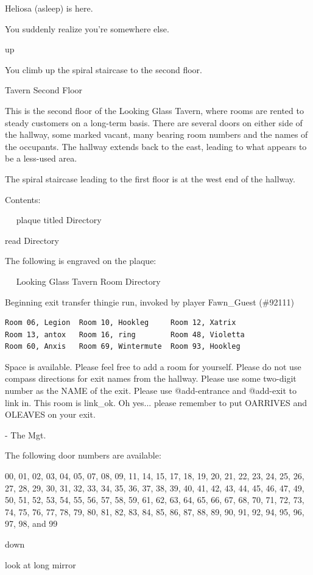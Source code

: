 \documentclass[10pt,twoside,openany]{memoir}
\begin{document}
{Heliosa (asleep) is here.

You suddenly realize you're somewhere else.

up

You climb up the spiral staircase to the second floor.

Tavern Second Floor

This is the second floor of the Looking Glass Tavern, where rooms are
rented to steady customers on a long-term basis.  There are several doors on
either side of the hallway, some marked vacant, many bearing room numbers and
the names of the occupants.  The hallway extends back to the east, leading
to what appears to be a less-used area.

The spiral staircase leading to the first floor is at the west end of the
 hallway.

Contents:

~ ~plaque titled Directory

read Directory

The following is engraved on the plaque:

~ ~Looking Glass Tavern Room Directory

Beginning exit transfer thingie run, invoked by player Fawn\_Guest (\#92111)

\begin{verbatim}
Room 06, Legion  Room 10, Hookleg     Room 12, Xatrix
Room 13, antox   Room 16, ring        Room 48, Violetta
Room 60, Anxis   Room 69, Wintermute  Room 93, Hookleg
\end{verbatim}

Space is available.  Please feel free to add a room for yourself.
Please do not use compass directions for exit names from the hallway.
Please use some two-digit number as the NAME of the exit.
Please use @add-entrance and @add-exit to link in.  This room is link\_ok.
Oh yes... please remember to put OARRIVES and OLEAVES on your exit.

- The Mgt.

The following door numbers are available:

00, 01, 02, 03, 04, 05, 07, 08, 09, 11, 14, 15, 17, 18, 19, 20, 21, 22, 23, 24, 25, 26, 27, 28, 29, 30, 31, 32, 33, 34, 35, 36, 37, 38, 39, 40, 41, 42, 43, 44, 45, 46, 47, 49, 50, 51, 52, 53, 54, 55, 56, 57, 58, 59, 61, 62, 63, 64, 65, 66, 67, 68, 70, 71, 72, 73, 74, 75, 76, 77, 78, 79, 80, 81, 82, 83, 84, 85, 86, 87, 88, 89, 90, 91, 92, 94, 95, 96, 97, 98, and 99

down

look at long mirror

}
\end{document}
